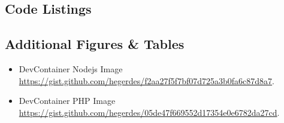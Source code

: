 \documentclass[12pt, a4paper]{article}
\begin{document}
\newpage

\singlespacing{}
\renewcommand{\thesubsection}{\Alph{subsection}}
\setcounter{page}{\value{lastroman}}



\newpage

\vspace*{\fill}
\vspace*{\fill}



\subsection{Code Listings}


\newpage

\subsection{Additional Figures \& Tables}


\newpage

\listoffigures
\listoftables
\lstlistoflistings{}
\vspace{-0.5cm}
\begin{itemize}
    \item DevContainer Nodejs Image  \\ \href{https://gist.github.com/hegerdes/f2aa27f5f7bf07d725a3b0fa6c87d8a7}{https://gist.github.com/hegerdes/f2aa27f5f7bf07d725a3b0fa6c87d8a7}.
    \item DevContainer PHP Image  \\ \href{https://gist.github.com/hegerdes/05de47f669552d17354e0e6782da27cd}{https://gist.github.com/hegerdes/05de47f669552d17354e0e6782da27cd}.
\end{itemize}

\newpage


% 
\end{document}
